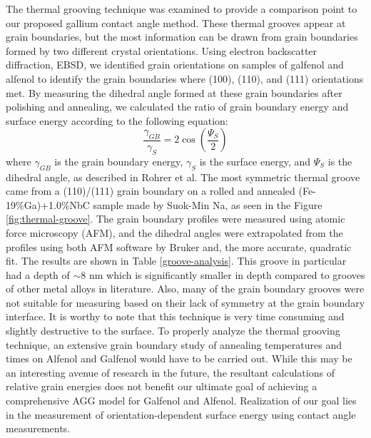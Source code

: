 The thermal grooving technique was examined to provide a comparison point to our proposed gallium contact angle method.  These thermal grooves appear at grain boundaries, but the most information can be drawn from grain boundaries formed by two different crystal orientations. Using electron backscatter diffraction, EBSD, we identified grain orientations on samples of galfenol and alfenol to identify the grain boundaries where \hkl(100), \hkl(110), and \hkl(111) orientations met.  By measuring the dihedral angle formed at these grain boundaries after polishing and annealing, we calculated the ratio of grain boundary energy and surface energy according to the following equation: 
\begin{equation}
\frac{\gamma_{GB}}{\gamma_{S}} = 2\cos\left(\frac{\Psi_{S}}{2}\right) 
\end{equation}
where $\gamma_{GB}$ is the grain boundary energy, $\gamma_{S}  $ is the surface energy, and $\Psi_{S} $ is the dihedral angle, as described in Rohrer et al.\cite{Rohrer2010a} The most symmetric thermal groove came from a \hkl(110)/\hkl(111) grain boundary on a rolled and annealed (Fe-19\%Ga)+1.0\%NbC sample made by Suok-Min Na, as seen in the Figure \ref{fig:thermal-groove}.  The grain boundary profiles were measured using atomic force microscopy (AFM), and the dihedral angles were extrapolated from the profiles using both AFM software by Bruker and, the more accurate, quadratic fit.  The results are shown in Table \ref{groove-analysis}.  This groove in particular had a depth of $\sim$8 nm which is significantly smaller in depth compared to grooves of other metal alloys in literature.  Also, many of the grain boundary grooves were not suitable for measuring based on their lack of symmetry at the grain boundary interface. It is worthy to note that this technique is very time consuming and slightly destructive to the surface. To properly analyze the thermal grooving technique, an extensive grain boundary study of annealing temperatures and times on Alfenol and Galfenol would have to be carried out. While this may be an interesting avenue of research in the future, the resultant calculations of relative grain energies does not benefit our ultimate goal of achieving a comprehensive AGG model for Galfenol and Alfenol. Realization of our goal lies in the measurement of orientation-dependent surface energy using contact angle measurements. 
	


